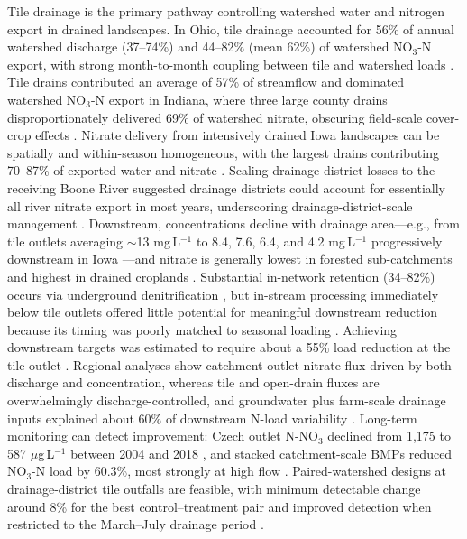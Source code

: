 \documentclass[11pt]{article}
\begin{document}
Tile drainage is the primary pathway controlling watershed water and nitrogen export in drained landscapes. In Ohio, tile drainage accounted for 56\% of annual watershed discharge (37--74\%) and 44--82\% (mean 62\%) of watershed NO$_3$-N export, with strong month-to-month coupling between tile and watershed loads \parencite{Williams2015}. Tile drains contributed an average of 57\% of streamflow and dominated watershed NO$_3$-N export in Indiana, where three large county drains disproportionately delivered 69\% of watershed nitrate, obscuring field-scale cover-crop effects \parencite{Grose2022}. Nitrate delivery from intensively drained Iowa landscapes can be spatially and within-season homogeneous, with the largest drains contributing 70--87\% of exported water and nitrate \parencite{Coupe2020}. Scaling drainage-district losses to the receiving Boone River suggested drainage districts could account for essentially all river nitrate export in most years, underscoring drainage-district-scale management \parencite{Ikenberry2014}. Downstream, concentrations decline with drainage area---e.g., from tile outlets averaging $\sim$13 mg\,L$^{-1}$ to 8.4, 7.6, 6.4, and 4.2 mg\,L$^{-1}$ progressively downstream in Iowa \parencite{Schilling2012b}---and nitrate is generally lowest in forested sub-catchments and highest in drained croplands \parencite{Billy2013}. Substantial in-network retention (34--82\%) occurs via underground denitrification \parencite{Billy2011}, but in-stream processing immediately below tile outlets offered little potential for meaningful downstream reduction because its timing was poorly matched to seasonal loading \parencite{Schilling2012b}. Achieving downstream targets was estimated to require about a 55\% load reduction at the tile outlet \parencite{Schilling2012b}. Regional analyses show catchment-outlet nitrate flux driven by both discharge and concentration, whereas tile and open-drain fluxes are overwhelmingly discharge-controlled, and groundwater plus farm-scale drainage inputs explained about 60\% of downstream N-load variability \parencite{Goeller2019}. Long-term monitoring can detect improvement: Czech outlet N-NO$_3$ declined from 1,175 to 587 $\mu$g\,L$^{-1}$ between 2004 and 2018 \parencite{Fraindová2022}, and stacked catchment-scale BMPs reduced NO$_3$-N load by 60.3\%, most strongly at high flow \parencite{Law2022}. Paired-watershed designs at drainage-district tile outfalls are feasible, with minimum detectable change around 8\% for the best control--treatment pair and improved detection when restricted to the March--July drainage period \parencite{Schilling2013}.
\end{document}
